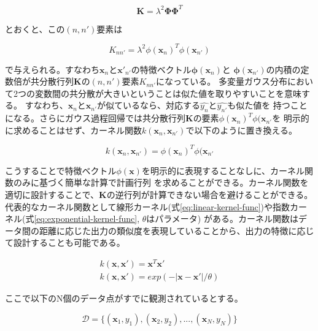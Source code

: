 \begin{equation}
\boldsymbol{K} = \lambda^2\boldsymbol{\Phi}\boldsymbol{\Phi}^T
\end{equation}

とおくと、この$(n,n')$要素は

\begin{equation}
K_{nn'} = \lambda^2\phi(\boldsymbol{x}_{n})^T\phi(\boldsymbol{x}_{n'})
\end{equation}

で与えられる。すなわち$\boldsymbol{x}_{n}$と$\boldsymbol{x'}_{n'}$の特徴ベクトル$\boldsymbol{\phi}(\boldsymbol{x}_{n})$と
$\boldsymbol{\phi}(\boldsymbol{x}_{n'})$の内積の定数倍が共分散行列$\boldsymbol{K}$の$(n,n')$要素$K_{nn'}$になっている。
多変量ガウス分布において2つの変数間の共分散が大きいということは似た値を取りやすいことを意味する。
すなわち、$\boldsymbol{x}_{n}$と$\boldsymbol{x}_{n'}$が似ているなら、対応する$\hat{y_{n}}$と$\hat{y_{n'}}$も似た値を
持つことになる。さらにガウス過程回帰では共分散行列$\boldsymbol{K}$の要素$\phi(\boldsymbol{x}_{n})^T\phi(\boldsymbol{x}_{n'}$を
明示的に求めることはせず、カーネル関数$k(\boldsymbol{x}_{n}, \boldsymbol{x}_{n'})$で以下のように置き換える。

\begin{equation}
k(\boldsymbol{x}_{n}, \boldsymbol{x}_{n'}) = \phi(\boldsymbol{x}_{n})^T\phi(\boldsymbol{x}_{n'} 
\end{equation}

こうすることで特徴ベクトル$\phi(\boldsymbol{x})$を明示的に表現することなしに、カーネル関数のみに基づく簡単な計算で計画行列
を求めることができる。カーネル関数を適切に設計することで、$\boldsymbol{K}$の逆行列が計算できない場合を避けることができる。
代表的なカーネル関数として線形カーネル(式\ref{eq:linear-kernel-func})や指数カーネル(式\ref{eq:exponential-kernel-func}, $\theta$はパラメータ)
がある。カーネル関数はデータ間の距離に応じた出力の類似度を表現していることから、出力の特徴に応じて設計することも可能である。

\begin{gather}
k(\boldsymbol{x}, \boldsymbol{x'}) = \boldsymbol{x}^T\boldsymbol{x'} \label{eq:linear-kernel-func} \\
k(\boldsymbol{x}, \boldsymbol{x'}) = exp(-|\boldsymbol{x} - \boldsymbol{x'}|/\theta) \label{eq:exponential-kernel-func}
\end{gather}

ここで以下のN個のデータ点がすでに観測されているとする。

\begin{equation}
\mathcal{D} = \{(\boldsymbol{x}_{1}, y_{1}), (\boldsymbol{x}_{2}, y_{2}), ..., (\boldsymbol{x}_{N}, y_{N})\}
\end{equation}

